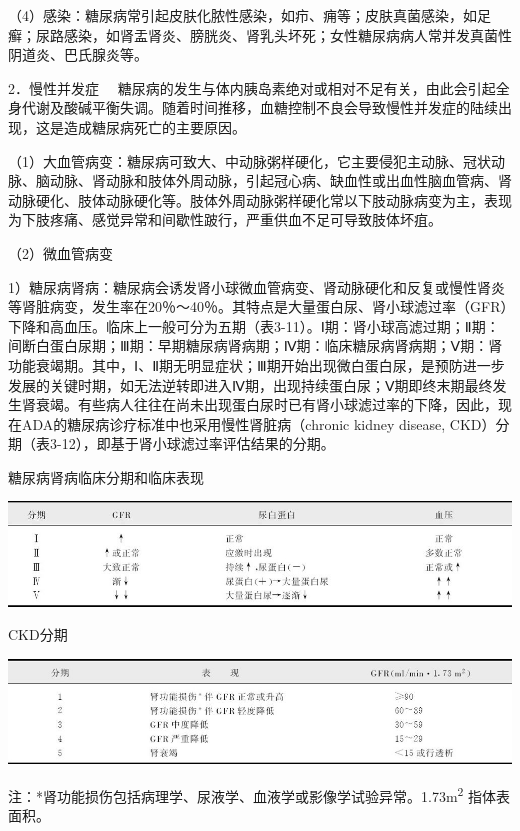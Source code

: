 （4）感染：糖尿病常引起皮肤化脓性感染，如疖、痈等；皮肤真菌感染，如足癣；尿路感染，如肾盂肾炎、膀胱炎、肾乳头坏死；女性糖尿病病人常并发真菌性阴道炎、巴氏腺炎等。

{2．慢性并发症}
　糖尿病的发生与体内胰岛素绝对或相对不足有关，由此会引起全身代谢及酸碱平衡失调。随着时间推移，血糖控制不良会导致慢性并发症的陆续出现，这是造成糖尿病死亡的主要原因。

（1）大血管病变：糖尿病可致大、中动脉粥样硬化，它主要侵犯主动脉、冠状动脉、脑动脉、肾动脉和肢体外周动脉，引起冠心病、缺血性或出血性脑血管病、肾动脉硬化、肢体动脉硬化等。肢体外周动脉粥样硬化常以下肢动脉病变为主，表现为下肢疼痛、感觉异常和间歇性跛行，严重供血不足可导致肢体坏疽。

（2）微血管病变

1）糖尿病肾病：糖尿病会诱发肾小球微血管病变、肾动脉硬化和反复或慢性肾炎等肾脏病变，发生率在20％～40％。其特点是大量蛋白尿、肾小球滤过率（GFR）下降和高血压。临床上一般可分为五期（表3-11）。Ⅰ期：肾小球高滤过期；Ⅱ期：间断白蛋白尿期；Ⅲ期：早期糖尿病肾病期；Ⅳ期：临床糖尿病肾病期；Ⅴ期：肾功能衰竭期。其中，Ⅰ、Ⅱ期无明显症状；Ⅲ期开始出现微白蛋白尿，是预防进一步发展的关键时期，如无法逆转即进入Ⅳ期，出现持续蛋白尿；Ⅴ期即终末期最终发生肾衰竭。有些病人往往在尚未出现蛋白尿时已有肾小球滤过率的下降，因此，现在ADA的糖尿病诊疗标准中也采用慢性肾脏病（chronic
kidney disease, CKD）分期（表3-12），即基于肾小球滤过率评估结果的分期。

\begin{table}[htbp]
\centering
\caption{糖尿病肾病临床分期和临床表现}
\label{tab3-11}
\includegraphics{./images/Image00027.jpg}
\end{table}

\begin{table}[htbp]
\centering
\caption{CKD分期}
\label{tab3-12}
\includegraphics{./images/Image00028.jpg}
\end{table}

注：*肾功能损伤包括病理学、尿液学、血液学或影像学试验异常。1.73m\textsuperscript{2}
指体表面积。

